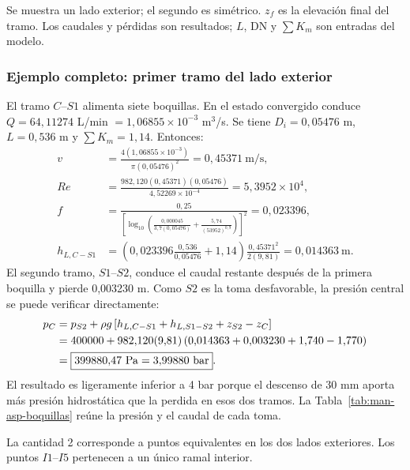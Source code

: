 \begin{table}[htbp]
\centering\small
\caption{Datos por tramo y pérdidas del estado convergido.}
\label{tab:man-asp-tramos}

\par\smallskip\footnotesize
Se muestra un lado exterior; el segundo es simétrico. $z_f$ es la elevación
final del tramo. Los caudales y pérdidas son resultados; $L$, DN y
$\sum K_m$ son entradas del modelo.
\end{table}

\subsubsection{Ejemplo completo: primer tramo del lado exterior}
El tramo $C$--$S1$ alimenta siete boquillas. En el estado convergido conduce
$Q=64{,}11274$ L/min $=1{,}06855\times10^{-3}$ m$^3$/s. Se tiene
$D_i=0{,}05476$ m, $L=0{,}536$ m y $\sum K_m=1{,}14$. Entonces:
\begin{align}
 v&=\frac{4(1{,}06855\times10^{-3})}{\pi(0{,}05476)^2}
 =0{,}45371\ \mathrm{m/s},\\
 Re&=\frac{982{,}120(0{,}45371)(0{,}05476)}{4{,}52269\times10^{-4}}
 =5{,}3952\times10^4,\\
 f&=\frac{0{,}25}{\left[\log_{10}\left(
 \frac{0{,}000045}{3{,}7(0{,}05476)}+
 \frac{5{,}74}{(53952)^{0{,}9}}\right)\right]^2}=0{,}023396,\\
 h_{L,C-S1}&=\left(0{,}023396\frac{0{,}536}{0{,}05476}+1{,}14\right)
 \frac{0{,}45371^2}{2(9{,}81)}=0{,}014363\ \mathrm{m}.
\end{align}
El segundo tramo, $S1$--$S2$, conduce el caudal restante después de la
primera boquilla y pierde 0,003230 m. Como $S2$ es la toma desfavorable,
la presión central se puede verificar directamente:
\begin{align}
 p_C&=p_{S2}+\rho g\left[h_{L,C-S1}+h_{L,S1-S2}+z_{S2}-z_C\right]\notag\\
 &=400000+982{,}120(9{,}81)
 \left(0{,}014363+0{,}003230+1{,}740-1{,}770\right)\notag\\
 &=\boxed{399880{,}47\ \mathrm{Pa}=3{,}99880\ \mathrm{bar}}.
 \label{eq:man-asp-pc}
\end{align}
El resultado es ligeramente inferior a 4 bar porque el descenso de 30 mm
aporta más presión hidrostática que la perdida en esos dos tramos. La
Tabla~\ref{tab:man-asp-boquillas} reúne la presión y el caudal de cada toma.

\begin{table}[htbp]
\centering\small
\caption{Presión y caudal calculados en las tomas de boquilla.}
\label{tab:man-asp-boquillas}

\par\smallskip\footnotesize
La cantidad 2 corresponde a puntos equivalentes en los dos lados exteriores.
Los puntos $I1$--$I5$ pertenecen a un único ramal interior.
\end{table}

